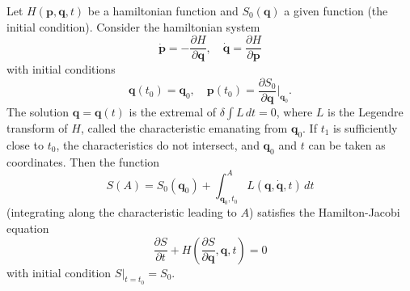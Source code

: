 Let $H(\mathbf{p}, \mathbf{q}, t)$ be a hamiltonian function and $S_0(\mathbf{q})$ a given function (the initial condition). Consider the hamiltonian system
$$\dot{\mathbf{p}} = -\frac{\partial H}{\partial \mathbf{q}}, \quad \dot{\mathbf{q}} = \frac{\partial H}{\partial \mathbf{p}}$$
with initial conditions
$$\mathbf{q}(t_0) = \mathbf{q}_0, \quad \mathbf{p}(t_0) = \frac{\partial S_0}{\partial \mathbf{q}}\bigg|_{\mathbf{q}_0}.$$
The solution $\mathbf{q} = \mathbf{q}(t)$ is the extremal of $\delta \int L \, dt = 0$, where $L$ is the Legendre transform of $H$, called the characteristic emanating from $\mathbf{q}_0$. If $t_1$ is sufficiently close to $t_0$, the characteristics do not intersect, and $\mathbf{q}_0$ and $t$ can be taken as coordinates. Then the function
$$S(A) = S_0(\mathbf{q}_0) + \int_{\mathbf{q}_0, t_0}^{A} L(\mathbf{q}, \dot{\mathbf{q}}, t) \, dt$$
(integrating along the characteristic leading to $A$) satisfies the Hamilton-Jacobi equation
$$\frac{\partial S}{\partial t} + H\left( \frac{\partial S}{\partial \mathbf{q}}, \mathbf{q}, t \right) = 0$$
with initial condition $S|_{t=t_0} = S_0$.
